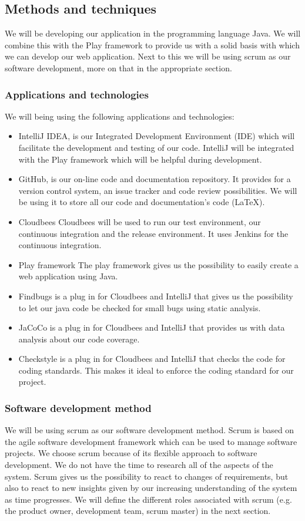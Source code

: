 \documentclass[]{article}
\begin{document}
\subsection{Methods and techniques}
We will be developing our application in the programming language Java.
We will combine this with the Play framework to provide us with a solid basis with which we can develop our web application.
Next to this we will be using scrum as our software development, more on that in the appropriate section.

\subsubsection{Applications and technologies}
We will being using the following applications and technologies:
\begin{itemize}
\item IntelliJ IDEA, is our Integrated Development Environment (IDE) which will facilitate the development and testing of our code.
IntelliJ will be integrated with the Play framework which will be helpful during development.
\item GitHub, is our on-line code and documentation repository.
It provides for a version control system, an issue tracker and code review possibilities.
We will be using it to store all our code and documentation's code (LaTeX).
\item Cloudbees
Cloudbees will be used to run our test environment, our continuous integration and the release environment.
It uses Jenkins for the continuous integration.
\item Play framework
The play framework gives us the possibility to easily create a web application using Java.
\item Findbugs is a plug in for Cloudbees and IntelliJ that gives us the possibility to let our java code be checked for small bugs using static analysis.
\item JaCoCo is a plug in for Cloudbees and IntelliJ that provides us with data analysis about our code coverage.
\item Checkstyle is a plug in for Cloudbees and IntelliJ that checks the code for coding standards.
This makes it ideal to enforce the coding standard for our project.
\end{itemize}

\subsubsection{Software development method}
We will be using scrum as our software development method.
Scrum is based on the agile software development framework which can be used to manage software projects.
We choose scrum because of its flexible approach to software development.
We do not have the time to research all of the aspects of the system.
Scrum gives us the possibility to react to changes of requirements, but also to react to new insights given by our increasing understanding of the system as time progresses.
We will define the different roles associated with scrum (e.g. the product owner, development team, scrum master) in the next section.
\end{document}
